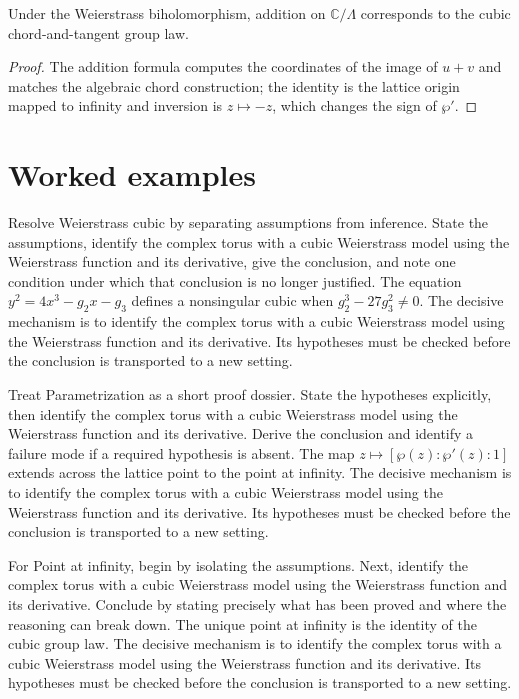 \begin{theorem}\label{thm:iv31-04}
Under the Weierstrass biholomorphism, addition on $\mathbb C/\Lambda$ corresponds to the cubic chord-and-tangent group law.
\begin{proof}
The addition formula computes the coordinates of the image of $u+v$ and matches the algebraic chord construction; the identity is the lattice origin mapped to infinity and inversion is $z\mapsto-z$, which changes the sign of $\wp'$.
\end{proof}
\end{theorem}

\section{Worked examples}

\begin{example}\label{ex:iv31-worked-01}
Resolve Weierstrass cubic by separating assumptions from inference. State the assumptions, identify the complex torus with a cubic Weierstrass model using the Weierstrass function and its derivative, give the conclusion, and note one condition under which that conclusion is no longer justified. The equation $y^2=4x^3-g_2x-g_3$ defines a nonsingular cubic when $g_2^3-27g_3^2\ne0$. The decisive mechanism is to identify the complex torus with a cubic Weierstrass model using the Weierstrass function and its derivative. Its hypotheses must be checked before the conclusion is transported to a new setting.
\end{example}

\begin{example}\label{ex:iv31-worked-02}
Treat Parametrization as a short proof dossier. State the hypotheses explicitly, then identify the complex torus with a cubic Weierstrass model using the Weierstrass function and its derivative. Derive the conclusion and identify a failure mode if a required hypothesis is absent. The map $z\mapsto[\wp(z):\wp'(z):1]$ extends across the lattice point to the point at infinity. The decisive mechanism is to identify the complex torus with a cubic Weierstrass model using the Weierstrass function and its derivative. Its hypotheses must be checked before the conclusion is transported to a new setting.
\end{example}

\begin{example}\label{ex:iv31-worked-03}
For Point at infinity, begin by isolating the assumptions. Next, identify the complex torus with a cubic Weierstrass model using the Weierstrass function and its derivative. Conclude by stating precisely what has been proved and where the reasoning can break down. The unique point at infinity is the identity of the cubic group law. The decisive mechanism is to identify the complex torus with a cubic Weierstrass model using the Weierstrass function and its derivative. Its hypotheses must be checked before the conclusion is transported to a new setting.
\end{example}


